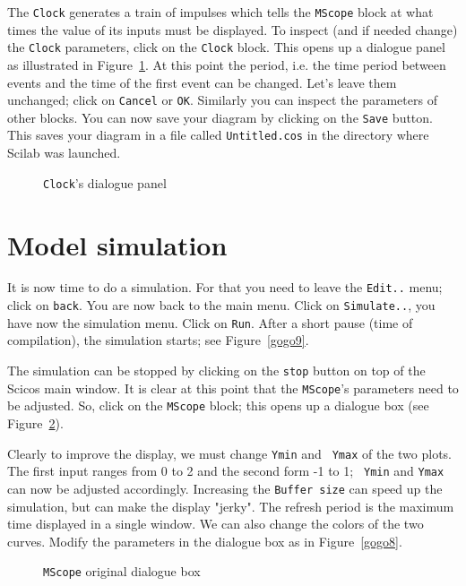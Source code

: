 \documentclass{book}
\begin{document}
\bigskip 

The {\tt Clock} generates a train of impulses which tells the {\tt MScope}
block at what times the value of its inputs must be displayed. To inspect (and if needed change)
the {\tt Clock} parameters, click on the {\tt Clock} block. 
This opens up a dialogue panel
as illustrated in Figure~\ref{gogo4}. At this point the period, i.e. the time period
between events and the time of the first event can be changed. 
Let's leave them unchanged;
click on {\tt Cancel} or {\tt OK}. Similarly you can inspect the parameters of other
blocks. You can now save your diagram by clicking on the {\tt Save} button. This saves
your diagram in a file called {\tt Untitled.cos} in the directory where Scilab was
launched. 
  \begin{figure}[hbtp]
  \centerline{}
  \caption{{\tt Clock}'s dialogue panel}
 \label{gogo4}
  \end{figure}

\section{Model simulation} 
It is now time to do a simulation. For that you need to 
leave the {\tt Edit..} menu; click
on {\tt back}. You are now back to the main menu. Click on {\tt Simulate..}, you have now
the simulation menu. Click on {\tt Run}. After a short
pause (time of compilation), the simulation starts; see Figure~\ref{gogo9}.


The simulation can be stopped by clicking on the {\tt stop} button on top of the Scicos main
window. It is clear at this point that the {\tt MScope}'s parameters need to be adjusted.
So, click on the {\tt MScope} block; this opens up a dialogue box (see Figure~\ref{gogo71}).


Clearly to improve the display, we must change {\tt Ymin} and {\tt
Ymax} of the two 
plots.
The first input ranges from 0 to 2 and the second form -1 to 1; {\tt
Ymin} and {\tt Ymax}
can now be adjusted accordingly. Increasing the {\tt Buffer size} 
can speed up the simulation,
but can make the display "jerky". The refresh period is the maximum 
time displayed in a single window. We can also change the colors of 
the two curves. Modify the parameters in 
the dialogue box as in Figure~\ref{gogo8}.
  \begin{figure}[hbtp]
  \centerline{}
  \caption{{\tt MScope} original dialogue box}
  \label{gogo71}
  \end{figure}
\end{document}
